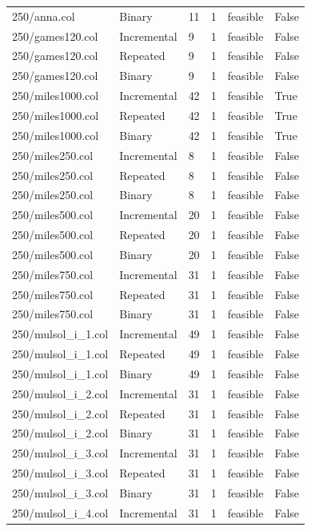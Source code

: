 \begin{table}[htbp]
\begin{tabular}{llllll}
250/anna.col & Binary & 11 & 1 & feasible & False \\
250/games120.col & Incremental & 9 & 1 & feasible & False \\
250/games120.col & Repeated & 9 & 1 & feasible & False \\
250/games120.col & Binary & 9 & 1 & feasible & False \\
250/miles1000.col & Incremental & 42 & 1 & feasible & True \\
250/miles1000.col & Repeated & 42 & 1 & feasible & True \\
250/miles1000.col & Binary & 42 & 1 & feasible & True \\
250/miles250.col & Incremental & 8 & 1 & feasible & False \\
250/miles250.col & Repeated & 8 & 1 & feasible & False \\
250/miles250.col & Binary & 8 & 1 & feasible & False \\
250/miles500.col & Incremental & 20 & 1 & feasible & False \\
250/miles500.col & Repeated & 20 & 1 & feasible & False \\
250/miles500.col & Binary & 20 & 1 & feasible & False \\
250/miles750.col & Incremental & 31 & 1 & feasible & False \\
250/miles750.col & Repeated & 31 & 1 & feasible & False \\
250/miles750.col & Binary & 31 & 1 & feasible & False \\
250/mulsol\_i\_1.col & Incremental & 49 & 1 & feasible & False \\
250/mulsol\_i\_1.col & Repeated & 49 & 1 & feasible & False \\
250/mulsol\_i\_1.col & Binary & 49 & 1 & feasible & False \\
250/mulsol\_i\_2.col & Incremental & 31 & 1 & feasible & False \\
250/mulsol\_i\_2.col & Repeated & 31 & 1 & feasible & False \\
250/mulsol\_i\_2.col & Binary & 31 & 1 & feasible & False \\
250/mulsol\_i\_3.col & Incremental & 31 & 1 & feasible & False \\
250/mulsol\_i\_3.col & Repeated & 31 & 1 & feasible & False \\
250/mulsol\_i\_3.col & Binary & 31 & 1 & feasible & False \\
250/mulsol\_i\_4.col & Incremental & 31 & 1 & feasible & False \\

\end{tabular}
\end{table}
